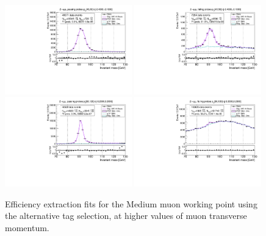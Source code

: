 {\begin{figure}
\centering
\includegraphics[width=0.49\textwidth]{figures/Zmm_AltTag_pass_ptBin7_etaBin0.pdf}
\includegraphics[width=0.49\textwidth]{figures/Zmm_AltTag_fail_ptBin7_etaBin0.pdf}
\includegraphics[width=0.49\textwidth]{figures/Zmm_AltTag_pass_ptBin10_etaBin6.pdf}
\includegraphics[width=0.49\textwidth]{figures/Zmm_AltTag_fail_ptBin10_etaBin6.pdf}
\caption{Efficiency extraction fits for the Medium muon working point using the alternative tag selection, at higher values of muon transverse momentum.}
\label{fig:ZmmAltAltTagFits2}
\end{figure}

}

